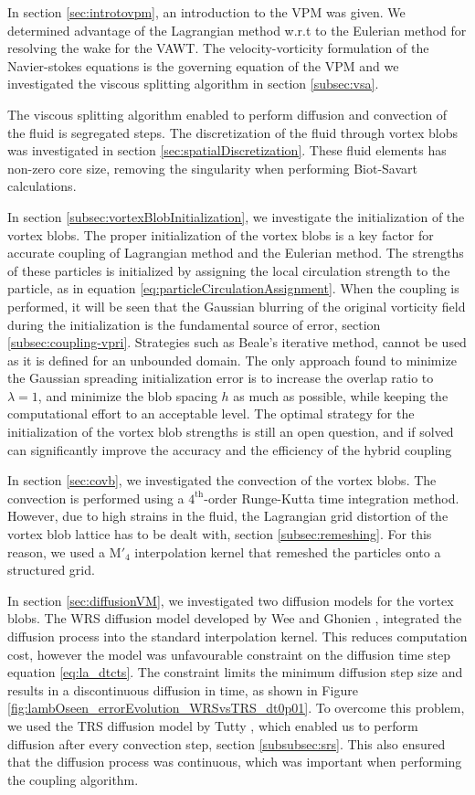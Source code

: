 In section \ref{sec:introtovpm}, an introduction to the VPM was given. We determined advantage of the Lagrangian method w.r.t to the Eulerian method for resolving the wake for the VAWT. The velocity-vorticity formulation of the Navier-stokes equations is the governing equation of the VPM and we investigated the viscous splitting algorithm in section \ref{subsec:vsa}.

The viscous splitting algorithm enabled to perform diffusion and convection of the fluid is segregated steps. The discretization of the fluid through vortex blobs was investigated in section \ref{sec:spatialDiscretization}. These fluid elements has non-zero core size, removing the singularity when performing Biot-Savart calculations. 

In section \ref{subsec:vortexBlobInitialization}, we investigate the initialization of the vortex blobs. The proper initialization of the vortex blobs is a key factor for accurate coupling of Lagrangian method and the Eulerian method. The strengths of these particles is initialized by assigning the local circulation strength to the particle, as in equation \ref{eq:particleCirculationAssignment}. When the coupling is performed, it will be seen that the Gaussian blurring of the original vorticity field during the initialization is the fundamental source of error, section 	\ref{subsec:coupling-vpri}. Strategies such as Beale's iterative method, cannot be used as it is defined for an unbounded domain. The only approach found to minimize the Gaussian spreading initialization error is to increase the overlap ratio to $\lambda=1$, and minimize the blob spacing $h$ as much as possible, while keeping the computational effort to an acceptable level. The optimal strategy for the initialization of the vortex blob strengths is still an open question, and if solved can significantly improve the accuracy and the efficiency of the hybrid coupling

In section \ref{sec:covb}, we investigated the convection of the vortex blobs. The convection is performed using a $4^{\mathrm{th}}$-order Runge-Kutta time integration method. However, due to high strains in the fluid, the Lagrangian grid distortion of the vortex blob lattice has to be dealt with, section \ref{subsec:remeshing}. For this reason, we used a $\mathrm{M}'_4$ interpolation kernel that remeshed the particles onto a structured grid.

In section \ref{sec:diffusionVM}, we investigated two diffusion models for the vortex blobs. The WRS diffusion model developed by Wee and Ghonien \cite{Wee2006a}, integrated the diffusion process into the standard interpolation kernel.  This reduces computation cost, however the model was unfavourable constraint on the diffusion time step  equation 
\ref{eq:la_dtcts}. The constraint limits the minimum diffusion step size and results in a discontinuous diffusion in time, as shown in Figure \ref{fig:lambOseen_errorEvolution_WRSvsTRS_dt0p01}. To overcome this problem, we used the TRS diffusion model by Tutty \cite{Tutty2010a}, which enabled us to perform diffusion after every convection step, section
\ref{subsubsec:srs}. This also ensured that the diffusion process was continuous, which was important when performing the coupling algorithm.

